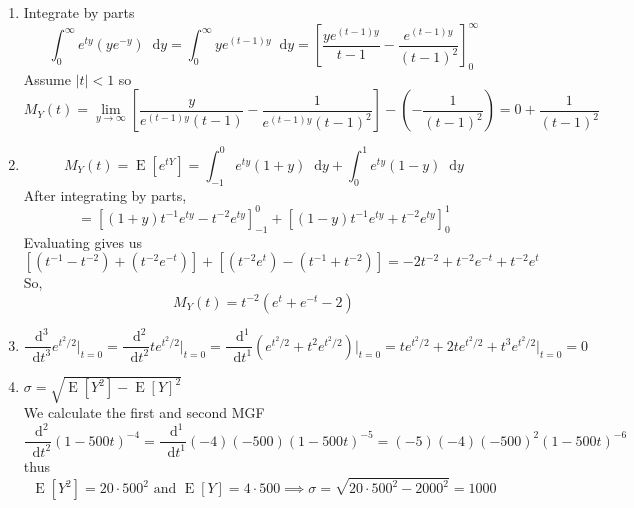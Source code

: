 \documentclass{article}
\newcommand{\expt}[1]{\operatorname{E}[#1]}
\newcommand*\diff{\mathop{}\!\mathrm{d}}
\newcommand{\drv}[3]{\frac{\diff#1^{#3}}{\diff#2^{#3}}}
\newcommand{\intv}[4]{\int_{#3}^{#4} #1 \diff #2}
\begin{document}
\begin{enumerate}
  \item 
  Integrate by parts
  \[
    \intv{e^{ty}\left(ye^{-y}\right)}{y}{0}{\infty}
    = \intv{ye^{(t-1)y}}{y}{0}{\infty} 
    = \left[\frac{ye^{(t-1)y}}{t-1} - \frac{e^{(t-1)y}}{(t-1)^2} \right]_{0}^{\infty}
  \]
  Assume $|t| < 1$ so \[
    M_Y(t) = \lim_{y\to\infty}
    \left[\frac{y}{e^{(t-1)y}(t-1)} - \frac{1}{e^{(t-1)y}(t-1)^2} \right] 
    - \left(-\frac{1}{(t-1)^2}\right) = 0 + \frac{1}{(t-1)^2}
  \]
  \item \[
    M_Y(t) = \expt{e^{tY}} = \intv{e^{ty}(1+y)}{y}{-1}{0} + \intv{e^{ty}(1-y)}{y}{0}{1}
  \]
  After integrating by parts,\[
    = \left[(1+y)t^{-1}e^{ty} - t^{-2}e^{ty}\right]_{-1}^{0} 
    + \left[(1-y)t^{-1}e^{ty} + t^{-2}e^{ty}\right]_{0}^{1}
  \]
  Evaluating gives us \[
    \left[ (t^{-1} - t^{-2}) + (t^{-2}e^{-t}) \right] + 
    \left[ (t^{-2}e^{t} )- (t^{-1} + t^{-2}) \right]
    = -2t^{-2} + t^{-2}e^{-t} + t^{-2}e^{t}
  \]
  So, \[
    M_Y(t) = t^{-2}\left( e^t + e^{-t} - 2 \right)
  \]
  \item \[
    \drv{}{t}{3}e^{t^2/2}\bigg\rvert_{t=0}
    = \drv{}{t}{2}te^{t^2/2}\bigg\rvert_{t=0} 
    = \drv{}{t}{1}(e^{t^2/2}+t^2e^{t^2/2})\bigg\rvert_{t=0}
    = te^{t^2/2} + 2te^{t^2/2} + t^3e^{t^2/2}\bigg\rvert_{t=0} = 0
  \]

  \item $\sigma = \sqrt{\expt{Y^2} - \expt{Y}^2}$\\ 
  We calculate the first and second MGF
  \[
    \drv{}{t}{2}(1 - 500t)^{-4}
    = \drv{}{t}{1}(-4)(-500)(1 - 500t)^{-5}
    = (-5)(-4)(-500)^2(1 - 500t)^{-6}
  \]
  thus \[
    \expt{Y^2} = 20\cdot 500^2\text{ and }\expt{Y} = 4\cdot 500 
    \implies \sigma = \sqrt{20\cdot 500^2 - 2000^2} = 1000
  \]
\end{enumerate}
\end{document}
